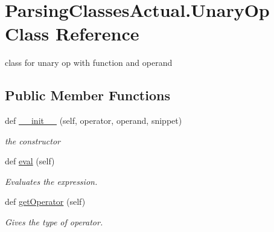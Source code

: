 \hypertarget{class_parsing_classes_actual_1_1_unary_op}{}\section{Parsing\+Classes\+Actual.\+Unary\+Op Class Reference}
\label{class_parsing_classes_actual_1_1_unary_op}


class for unary op with function and operand  


\subsection*{Public Member Functions}
\begin{DoxyCompactItemize}
\item 
def \hyperlink{class_parsing_classes_actual_1_1_unary_op_ae822716a1ac45674aa119773fb9eb0aa}{\+\_\+\+\_\+init\+\_\+\+\_\+} (self, operator, operand, snippet)
\begin{DoxyCompactList}\small\item\em the constructor \end{DoxyCompactList}\item 
def \hyperlink{class_parsing_classes_actual_1_1_unary_op_a825795bcc2929152bb0ca9618ab419ad}{eval} (self)\hypertarget{class_parsing_classes_actual_1_1_unary_op_a825795bcc2929152bb0ca9618ab419ad}{}\label{class_parsing_classes_actual_1_1_unary_op_a825795bcc2929152bb0ca9618ab419ad}

\begin{DoxyCompactList}\small\item\em Evaluates the expression. \end{DoxyCompactList}\item 
def \hyperlink{class_parsing_classes_actual_1_1_unary_op_a708a1db9dea33517c487d535082c49c4}{get\+Operator} (self)\hypertarget{class_parsing_classes_actual_1_1_unary_op_a708a1db9dea33517c487d535082c49c4}{}\label{class_parsing_classes_actual_1_1_unary_op_a708a1db9dea33517c487d535082c49c4}

\begin{DoxyCompactList}\small\item\em Gives the type of operator. \end{DoxyCompactList}\end{DoxyCompactItemize}
